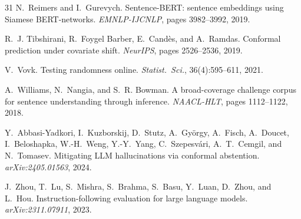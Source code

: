 \begin{thebibliography}{31}
 N.~Reimers and I.~Gurevych. Sentence-BERT: sentence
embeddings using Siamese BERT-networks. \emph{EMNLP-IJCNLP}, pages
3982--3992, 2019.

 R.~J. Tibshirani, R.~Foygel Barber, E.~Cand\`es, and
A.~Ramdas. Conformal prediction under covariate shift. \emph{NeurIPS}, pages
2526--2536, 2019.

 V.~Vovk. Testing randomness online. \emph{Statist.\ Sci.},
36(4):595--611, 2021.

 A.~Williams, N.~Nangia, and S.~R. Bowman. A
broad-coverage challenge corpus for sentence understanding through inference.
\emph{NAACL-HLT}, pages 1112--1122, 2018.

 Y.~Abbasi-Yadkori, I.~Kuzborskij, D.~Stutz,
A.~Gy\"orgy, A.~Fisch, A.~Doucet, I.~Beloshapka, W.-H.~Weng, Y.-Y.~Yang,
C.~Szepesv\'ari, A.~T.~Cemgil, and N.~Tomasev. Mitigating LLM hallucinations
via conformal abstention. \emph{arXiv:2405.01563}, 2024.

 J.~Zhou, T.~Lu, S.~Mishra, S.~Brahma, S.~Basu, Y.~Luan,
D.~Zhou, and L.~Hou. Instruction-following evaluation for large language
models. \emph{arXiv:2311.07911}, 2023.

\end{thebibliography}
